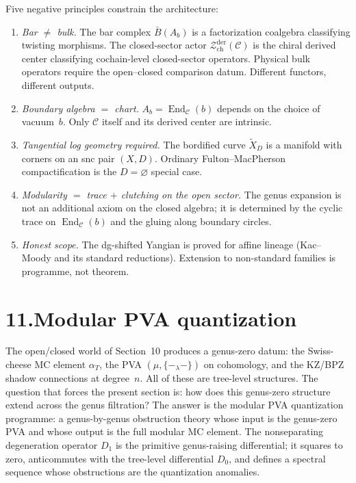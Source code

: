 \documentclass[11pt]{report}
\theoremstyle{definition}
\theoremstyle{remark}
\providecommand{\cZ}{\mathcal{Z}}
\providecommand{\barB}{\bar{B}}
\numberwithin{equation}{section}
\begin{document}
\medskip
Five negative principles constrain the architecture:
\begin{enumerate}[label=\textup{N\arabic*.},nosep]
\item \emph{Bar $\neq$ bulk.}
 The bar complex $\barB(A_b)$ is a factorization coalgebra
 classifying twisting morphisms. The closed-sector actor
 $\cZ^{\mathrm{der}}_{\mathrm{ch}}(\mathcal C)$ is the chiral
 derived center classifying cochain-level closed-sector operators.
 Physical bulk operators require the open--closed comparison datum.
 Different functors, different outputs.
\item \emph{Boundary algebra $=$ chart.}
 $A_b = \operatorname{End}_{\mathcal C}(b)$ depends on the choice
 of vacuum~$b$. Only $\mathcal C$ itself and its derived center
 are intrinsic.
\item \emph{Tangential log geometry required.}
 The bordified curve $\widetilde{X}_D$ is a manifold with corners
 on an snc pair $(X,D)$. Ordinary Fulton--MacPherson
 compactification is the $D = \varnothing$ special case.
\item \emph{Modularity $=$ trace $+$ clutching on the open sector.}
 The genus expansion is not an additional axiom on the closed
 algebra; it is determined by the cyclic trace on
 $\operatorname{End}_{\mathcal C}(b)$ and the gluing along
 boundary circles.
\item \emph{Honest scope.}
 The dg-shifted Yangian is proved for affine lineage (Kac--Moody
 and its standard reductions). Extension to non-standard families
 is programme, not theorem.
\end{enumerate}

\section*{11.\quad Modular PVA quantization}

The open/closed world of Section~10 produces a genus-zero datum: the
Swiss-cheese MC element $\alpha_T$, the PVA
$(\mu,\{-_\lambda-\})$ on cohomology, and the KZ/BPZ shadow
connections at degree~$n$. All of these are tree-level structures.
The question that forces the present section is: how does this
genus-zero structure extend across the genus filtration? The
answer is the modular PVA quantization programme: a
genus-by-genus obstruction theory whose input is the genus-zero
PVA and whose output is the full modular MC element. The
nonseparating degeneration operator $D_1$ is the primitive
genus-raising differential; it squares to zero, anticommutes
with the tree-level differential $D_0$, and defines a spectral
sequence whose obstructions are the quantization anomalies.
\end{document}
